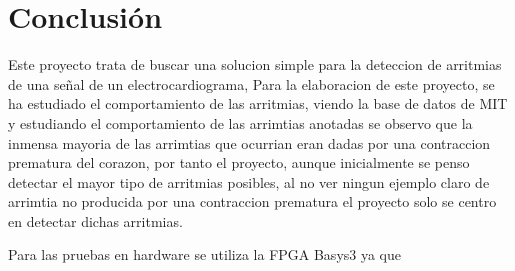\chapter{Conclusión}
Este proyecto trata de buscar una solucion simple para la deteccion de 
arritmias de una señal de un electrocardiograma, Para la elaboracion de este proyecto, 
se ha estudiado el comportamiento de las arritmias, viendo la base de datos de MIT y estudiando
el comportamiento de las arrimtias anotadas se observo que la inmensa mayoria de las arrimtias 
que ocurrian eran dadas por una contraccion prematura del corazon, por tanto el proyecto, aunque
inicialmente se penso detectar el mayor tipo de arritmias posibles, al no ver ningun ejemplo claro
de arrimtia no producida por una contraccion prematura el proyecto solo se centro en detectar dichas arritmias.

Para las pruebas en hardware se utiliza la FPGA Basys3 ya que 
	